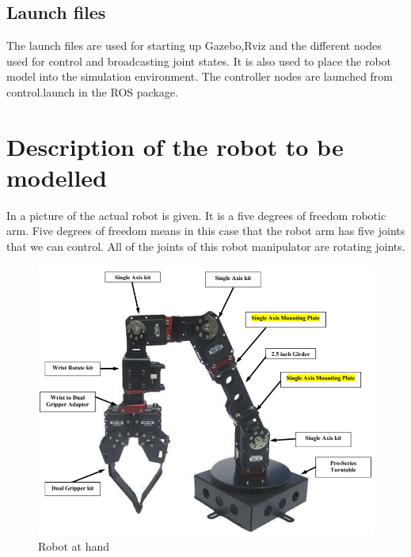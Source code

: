 \subsection{Launch files}
The launch files are used for starting up Gazebo,Rviz and the different nodes used for control and broadcasting joint states. It is also used to place the robot model into the simulation environment. The controller nodes are launched from control.launch in the ROS package. 



























\section{Description of the robot to be modelled}
In  a picture of the actual robot is given. It is a five degrees of freedom robotic arm. Five degrees of freedom means in this case that the robot arm has five joints that we can control. All of the joints of this robot manipulator are rotating joints\cite{Crustcrawler}. 

\begin{figure}[htbp]
  \centering
  \includegraphics[width=.7\textwidth]{img/robotAH.png}
  \caption{Robot at hand}
  \label{fig:robotAH}
\end{figure}



